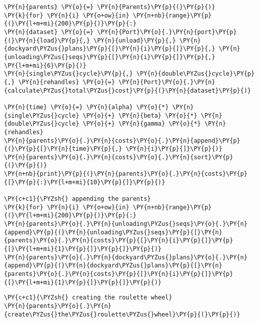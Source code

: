 \begin{tcolorbox}[breakable, size=fbox, boxrule=1pt, pad at break*=1mm,colback=cellbackground, colframe=cellborder]
\begin{Verbatim}[commandchars=\\\{\}]
\PY{n}{parents} \PY{o}{=} \PY{n}{Parents}\PY{p}{(}\PY{p}{)}
\PY{k}{for} \PY{n}{i} \PY{o+ow}{in} \PY{n+nb}{range}\PY{p}{(}\PY{l+m+mi}{200}\PY{p}{)}\PY{p}{:}
\PY{n}{dataset} \PY{o}{=} \PY{n}{Port}\PY{o}{.}\PY{n}{port}\PY{p}{(}\PY{n}{load}\PY{p}{,} \PY{n}{unload}\PY{p}{,} \PY{n}{dockyard\PYZus{}plans}\PY{p}{[}\PY{n}{i}\PY{p}{]}\PY{p}{,} \PY{n}{unloading\PYZus{}seqs}\PY{p}{[}\PY{n}{i}\PY{p}{]}\PY{p}{,} \PY{l+m+mi}{6}\PY{p}{)}
\PY{n}{single\PYZus{}cycle}\PY{p}{,} \PY{n}{double\PYZus{}cycle}\PY{p}{,} \PY{n}{rehandles} \PY{o}{=} \PY{n}{Port}\PY{o}{.}\PY{n}{calculate\PYZus{}total\PYZus{}cost}\PY{p}{(}\PY{n}{dataset}\PY{p}{)}

\PY{n}{time} \PY{o}{=} \PY{n}{alpha} \PY{o}{*} \PY{n}{single\PYZus{}cycle} \PY{o}{+} \PY{n}{beta} \PY{o}{*} \PY{n}{double\PYZus{}cycle} \PY{o}{+} \PY{n}{gamma} \PY{o}{*} \PY{n}{rehandles}
\PY{n}{parents}\PY{o}{.}\PY{n}{costs}\PY{o}{.}\PY{n}{append}\PY{p}{(}\PY{p}{[}\PY{n}{time}\PY{p}{,} \PY{n}{i}\PY{p}{]}\PY{p}{)}
\PY{n}{parents}\PY{o}{.}\PY{n}{costs}\PY{o}{.}\PY{n}{sort}\PY{p}{(}\PY{p}{)}
\PY{n+nb}{print}\PY{p}{(}\PY{n}{parents}\PY{o}{.}\PY{n}{costs}\PY{p}{[}\PY{p}{:}\PY{l+m+mi}{10}\PY{p}{]}\PY{p}{)}

\PY{c+c1}{\PYZsh{} appending the parents}
\PY{k}{for} \PY{n}{i} \PY{o+ow}{in} \PY{n+nb}{range}\PY{p}{(}\PY{l+m+mi}{200}\PY{p}{)}\PY{p}{:}
\PY{n}{parents}\PY{o}{.}\PY{n}{unloading\PYZus{}seqs}\PY{o}{.}\PY{n}{append}\PY{p}{(}\PY{n}{unloading\PYZus{}seqs}\PY{p}{[}\PY{n}{parents}\PY{o}{.}\PY{n}{costs}\PY{p}{[}\PY{n}{i}\PY{p}{]}\PY{p}{[}\PY{l+m+mi}{1}\PY{p}{]}\PY{p}{]}\PY{p}{)}
\PY{n}{parents}\PY{o}{.}\PY{n}{dockyard\PYZus{}plans}\PY{o}{.}\PY{n}{append}\PY{p}{(}\PY{n}{dockyard\PYZus{}plans}\PY{p}{[}\PY{n}{parents}\PY{o}{.}\PY{n}{costs}\PY{p}{[}\PY{n}{i}\PY{p}{]}\PY{p}{[}\PY{l+m+mi}{1}\PY{p}{]}\PY{p}{]}\PY{p}{)}
\end{Verbatim}
\end{tcolorbox}

\begin{tcolorbox}[breakable, size=fbox, boxrule=1pt, pad at break*=1mm,colback=cellbackground, colframe=cellborder]
\begin{Verbatim}[commandchars=\\\{\}]
\PY{c+c1}{\PYZsh{} creating the roulette wheel}
\PY{n}{parents}\PY{o}{.}\PY{n}{create\PYZus{}the\PYZus{}roulette\PYZus{}wheel}\PY{p}{(}\PY{p}{)}
\end{Verbatim}
\end{tcolorbox}

